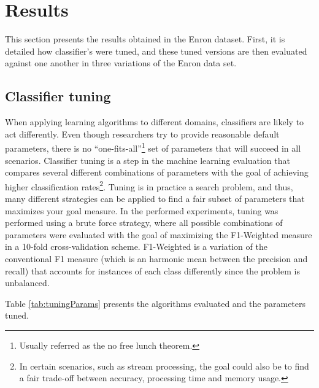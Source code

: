 \documentclass[11pt]{article}
\begin{document}
\section{Results} \label{sec:results}

	This section presents the results obtained in the Enron dataset.
	First, it is detailed how classifier's were tuned, and these tuned versions are then evaluated against one another in three variations of the Enron data set.

	\subsection{Classifier tuning}
	
	
		When applying learning algorithms to different domains, classifiers are likely to act differently.
		Even though researchers try to provide reasonable default parameters, there is no ``one-fits-all''\footnote{Usually referred as the no free lunch theorem.} set of parameters that will succeed in all scenarios.
		Classifier tuning is a step in the machine learning evaluation that compares several different combinations of parameters with the goal of achieving higher classification rates\footnote{In certain scenarios, such as stream processing, the goal could also be to find a fair trade-off between accuracy, processing time and memory usage.}.
		Tuning is in practice a search problem, and thus, many different strategies can be applied to find a fair subset of parameters that maximizes your goal measure.
		In the performed experiments, tuning was performed using a brute force strategy, where all possible combinations of parameters were evaluated with the goal of maximizing the F1-Weighted measure in a 10-fold cross-validation scheme.
		F1-Weighted is a variation of the conventional F1 measure (which is an harmonic mean between the precision and recall) that accounts for instances of each class differently since the problem is unbalanced.
	
		Table \ref{tab:tuningParams} presents the algorithms evaluated and the parameters tuned.
		
\end{document}
